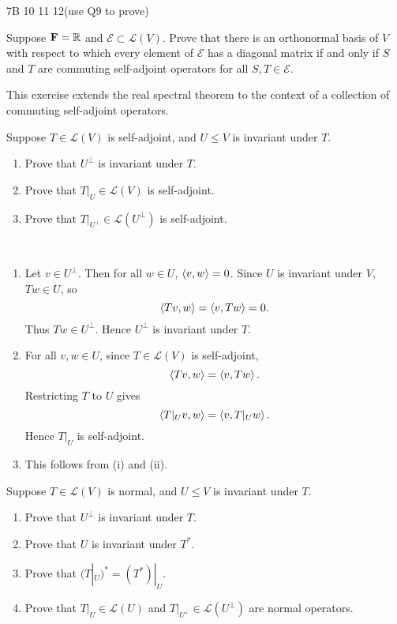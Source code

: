 7B 10 11 12(use Q9 to prove)

\begin{exercise}
Suppose $\mathbf F=\mathbb R$ and $\mathcal{E}\subset\mathcal{L}(V)$. Prove that there is an orthonormal basis of $V$ with respect to which every element of $\mathcal{E}$ has a diagonal matrix if and only if $S$ and $T$ are commuting self-adjoint operators for all $S,T\in\mathcal{E}$.
\end{exercise}

This exercise extends the real spectral theorem to the context of a collection of commuting self-adjoint operators.

\begin{exercise}
Suppose $T\in\mathcal{L}(V)$ is self-adjoint, and $U\le V$ is invariant under $T$.
\begin{enumerate}[label=(\roman*)]
\item Prove that $U^\perp$ is invariant under $T$.
\item Prove that $T|_U\in\mathcal{L}(V)$ is self-adjoint.
\item Prove that $T|_{U^\perp}\in\mathcal{L}(U^\perp)$ is self-adjoint.
\end{enumerate}
\end{exercise}

\begin{solution} \
\begin{enumerate}[label=(\roman*)]
\item Let $v\in U^\perp$. Then for all $w\in U$, $\left\langle v,w\right\rangle=0$.
Since $U$ is invariant under $V$, $Tw\in U$, so
\[\left\langle Tv,w\right\rangle=\left\langle v,Tw\right\rangle=0.\]
Thus $Tw\in U^\perp$. Hence $U^\perp$ is invariant under $T$.

\item For all $v,w\in U$, since $T\in\mathcal{L}(V)$ is self-adjoint, 
\[\left\langle Tv,w\right\rangle=\left\langle v,Tw\right\rangle.\]
Restricting $T$ to $U$ gives
\[\left\langle T|_U v,w\right\rangle=\left\langle v,T|_U w\right\rangle.\]
Hence $T|_U$ is self-adjoint.

\item This follows from (i) and (ii).
\end{enumerate}
\end{solution}

\begin{exercise}
Suppose $T\in\mathcal{L}(V)$ is normal, and $U\le V$ is invariant under $T$.
\begin{enumerate}[label=(\roman*)]
\item Prove that $U^\perp$ is invariant under $T$.
\item Prove that $U$ is invariant under $T^*$.
\item Prove that $(T|_U)^*=(T^*)|_U$.
\item Prove that $T|_U\in\mathcal{L}(U)$ and $T|_{U^\perp}\in\mathcal{L}(U^\perp)$ are normal operators.
\end{enumerate}
\end{exercise}

